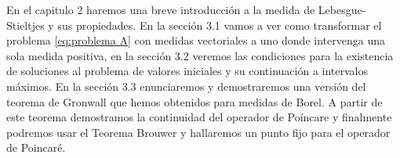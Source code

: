 En el capitulo 2 haremos una breve introducción a la medida de Lebesgue-Stieltjes y sus propiedades.  En la sección 3.1 vamos a ver como transformar el problema \eqref{eq:problema A} con medidas vectoriales a uno donde intervenga una sola medida positiva, en la sección 3.2 veremos las condiciones para la existencia de soluciones al problema de valores iniciales y su continuación a intervalos máximos. En la sección 3.3 enunciaremos y demostraremos una versión del teorema de Gronwall que hemos obtenidos para medidas de Borel. A partir de este teorema demostramos la continuidad del operador de Poíncare y finalmente podremos usar el Teorema Brouwer y  hallaremos un punto fijo para el operador de Poincaré.  
